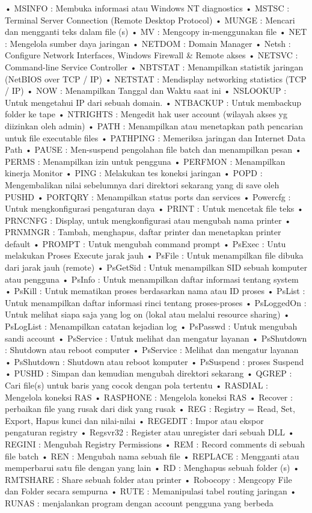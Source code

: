 \documentclass{article}
\begin{document}
• MSINFO : Membuka informasi atau Windows NT diagnostics
• MSTSC : Terminal Server Connection (Remote Desktop Protocol)
• MUNGE : Mencari dan mengganti teks dalam file (s)
• MV : Mengcopy in-menggunakan file
• NET : Mengelola sumber daya jaringan
• NETDOM : Domain Manager
• Netsh : Configure Network Interfaces, Windows Firewall & Remote akses
• NETSVC : Command-line Service Controller
• NBTSTAT : Menampilkan statistik jaringan (NetBIOS over TCP / IP)
• NETSTAT : Mendisplay networking statistics (TCP / IP)
• NOW : Menampilkan  Tanggal dan Waktu saat ini
• NSLOOKUP : Untuk mengetahui IP dari sebuah domain.
• NTBACKUP : Untuk membackup  folder ke tape
• NTRIGHTS : Mengedit hak user account (wilayah akses yg diizinkan oleh admin)
• PATH : Menampilkan atau menetapkan path pencarian untuk file executable files
• PATHPING : Memeriksa jaringan dan Internet Data Path
• PAUSE : Men-suspend pengolahan file batch dan menampilkan pesan
• PERMS : Menampilkan izin untuk pengguna
• PERFMON : Menampilkan kinerja Monitor
• PING : Melakukan tes koneksi jaringan
• POPD : Mengembalikan nilai sebelumnya dari direktori sekarang yang di save oleh PUSHD
• PORTQRY : Menampilkan status ports dan services
• Powercfg : Untuk mengkonfigurasi pengaturan daya
• PRINT : Untuk mencetak file teks
• PRNCNFG : Display, untuk mengkonfigurasi atau mengubah nama printer
• PRNMNGR : Tambah, menghapus, daftar printer dan menetapkan printer default
• PROMPT : Untuk mengubah command prompt
• PsExec : Untu melakukan Proses Execute jarak jauh
• PsFile : Untuk menampilkan file dibuka dari jarak jauh (remote)
• PsGetSid : Untuk menampilkan SID sebuah komputer atau pengguna
• PsInfo : Untuk menampilkan daftar informasi tentang system
• PsKill : Untuk mematikan proses berdasarkan nama atau ID proses
• PsList : Untuk menampilkan daftar informasi rinci tentang proses-proses
• PsLoggedOn : Untuk melihat siapa saja yang log on (lokal atau melalui resource sharing)
• PsLogList : Menampilkan catatan kejadian log
• PsPasswd : Untuk mengubah sandi account
• PsService : Untuk melihat dan mengatur layanan
• PsShutdown : Shutdown atau reboot computer
• PsService : Melihat dan mengatur layanan 
• PsShutdown : Shutdown atau reboot komputer 
• PsSuspend : proses Suspend 
• PUSHD : Simpan dan kemudian mengubah direktori sekarang 
• QGREP : Cari file(s) untuk baris yang cocok dengan pola tertentu
• RASDIAL : Mengelola koneksi RAS 
• RASPHONE : Mengelola koneksi RAS 
• Recover : perbaikan file yang rusak dari disk yang rusak 
• REG : Registry = Read, Set, Export, Hapus kunci dan nilai-nilai 
• REGEDIT : Impor atau ekspor  pengaturan registry
• Regsvr32 : Register atau unregister dari sebuah DLL
• REGINI : Mengubah Registry Permissions 
• REM : Record comments di sebuah file batch 
• REN : Mengubah nama sebuah file
• REPLACE : Mengganti atau memperbarui satu file dengan yang lain
• RD : Menghapus sebuah folder (s)
• RMTSHARE : Share sebuah folder atau printer 
• Robocopy : Mengcopy File dan Folder secara sempurna 
• RUTE : Memanipulasi tabel routing jaringan 
• RUNAS : menjalankan program dengan account pengguna yang berbeda
\end{document}
